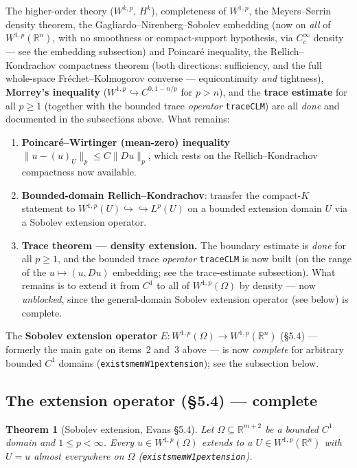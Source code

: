 ﻿\documentclass[12pt, a4paper]{article}
\renewcommand{\_}{\origunderscore\allowbreak}
\theoremstyle{definition}
\theoremstyle{plain}
\newtheorem{theorem}{Theorem}[section]
\begin{document}
The higher-order theory ($W^{k,p}$, $H^k$), completeness of $W^{1,p}$, the Meyers--Serrin density
theorem, the Gagliardo--Nirenberg--Sobolev embedding (now on \emph{all} of $W^{1,p}(\mathbb{R}^n)$,
with no smoothness or compact-support hypothesis, via $C^\infty_c$ density --- see the embedding
subsection) and Poincar\'e inequality, the Rellich--Kondrachov compactness theorem (both directions:
sufficiency, and the full whole-space Fréchet--Kolmogorov converse --- equicontinuity \emph{and}
tightness), \textbf{Morrey's inequality} ($W^{1,p}\hookrightarrow C^{0,1-n/p}$ for $p>n$), and the
\textbf{trace estimate} for all $p\ge1$ (together with the bounded trace \emph{operator}
\texttt{traceCLM}) are all \emph{done} and documented in the subsections above.
What remains:

\begin{enumerate}
  \item \textbf{Poincar\'e--Wirtinger (mean-zero) inequality} $\|u-(u)_U\|_p\le C\|Du\|_p$, which
    rests on the Rellich--Kondrachov compactness now available.
  \item \textbf{Bounded-domain Rellich--Kondrachov}: transfer the compact-$K$ statement to
    $W^{1,p}(U)\hookrightarrow\hookrightarrow L^p(U)$ on a bounded extension domain $U$ via a Sobolev
    extension operator.
  \item \textbf{Trace theorem --- density extension.}  The boundary estimate is \emph{done} for all
    $p\ge 1$, and the bounded trace \emph{operator} \texttt{traceCLM} is now built (on the range of the
    $u\mapsto(u,Du)$ embedding; see the trace-estimate subsection).  What remains is to extend it from
    $C^1$ to all of $W^{1,p}(\Omega)$ by density --- now \emph{unblocked}, since the general-domain
    Sobolev extension operator (see below) is complete.
\end{enumerate}

The \textbf{Sobolev extension operator} $E\colon W^{1,p}(\Omega)\to W^{1,p}(\mathbb{R}^n)$ (\S5.4) ---
formerly the main gate on items~2 and~3 above --- is now \emph{complete} for arbitrary bounded $C^1$
domains (\texttt{exists\_memW1p\_extension}); see the subsection below.

\subsection{The extension operator (§5.4) --- complete}

\begin{theorem}[Sobolev extension, Evans §5.4]
Let $\Omega\subseteq\mathbb{R}^{m+2}$ be a bounded $C^1$ domain and $1\le p<\infty$.  Every
$u\in W^{1,p}(\Omega)$ extends to a $U\in W^{1,p}(\mathbb{R}^n)$ with $U=u$ almost everywhere on
$\Omega$ (\texttt{exists\_memW1p\_extension}).
\end{theorem}
\end{document}
